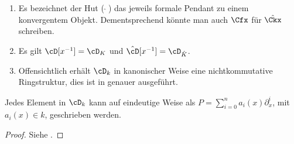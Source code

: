 \begin{bem}
\begin{enumerate}
\item Es bezeichnet der Hut ($ \, \hat \,\, $) das jeweils formale Pendant
zu einem konvergentem Objekt. Dementsprechend könnte man auch $\Cfx$ für
$\hat{\Ckx}$ schreiben.
\item Es gilt $\cD[x^{-1}]=\cD_K$ und $\hat \cD[x^{-1}]=\cD_{\hat K}$.
\item Offensichtlich erhält $\cD_k$ in kanonischer Weise eine nichtkommutative
Ringstruktur, dies ist in \cite[Kapittel 2 Section 1]{ZulaBarbara} genauer
ausgeführt.
\end{enumerate}
\end{bem}

\begin{prop} \label{prop:weyl_eindeutige_schreibung}
Jedes Element in $\cD_k$ kann auf eindeutige
Weise als $P=\sum_{i=0}^na_i(x)\partial_x^i$, mit $a_i(x)\in k$, geschrieben
werden.
\end{prop}
\begin{proof}
Siehe \cite[Proposition 1.2.3]{sabbah_cimpa90}.
\end{proof}
\begin{comment}
Gilt das folgende??
\[
\alpha_i(x)\partial_x^i \equiv \frac{\alpha_i}{x^i}(x\partial_x)^i \mod
F_{i-1}\cD
\]
\end{comment}

